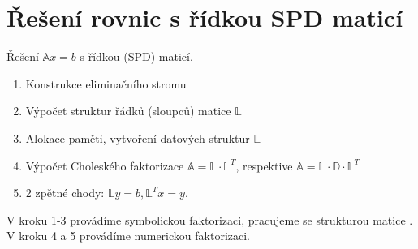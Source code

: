 \documentclass[../main.tex]{subfiles}
\begin{document}
\section{Řešení rovnic s řídkou SPD maticí}
Řešení $\mathbb{A} x = b $ s řídkou (SPD) maticí.

\begin{enumerate}
    \item Konstrukce eliminačního stromu
    \item Výpočet struktur řádků (sloupců) matice  $\mathbb{L}$
    \item Alokace paměti, vytvoření datových struktur $\mathbb{L}$
    \item Výpočet Choleského faktorizace $\mathbb{A}=\mathbb{L}\cdot\mathbb{L}^T$, respektive $\mathbb{A}=\mathbb{L}\cdot \mathbb{D} \cdot \mathbb{L}^T$
    \item 2 zpětné chody: $\mathbb{L} y = b, \mathbb{L}^T x = y$.
\end{enumerate}

V kroku 1-3 provádíme symbolickou faktorizaci, pracujeme se strukturou matice \matA.
V kroku 4 a 5 provádíme numerickou faktorizaci.
\end{document}
